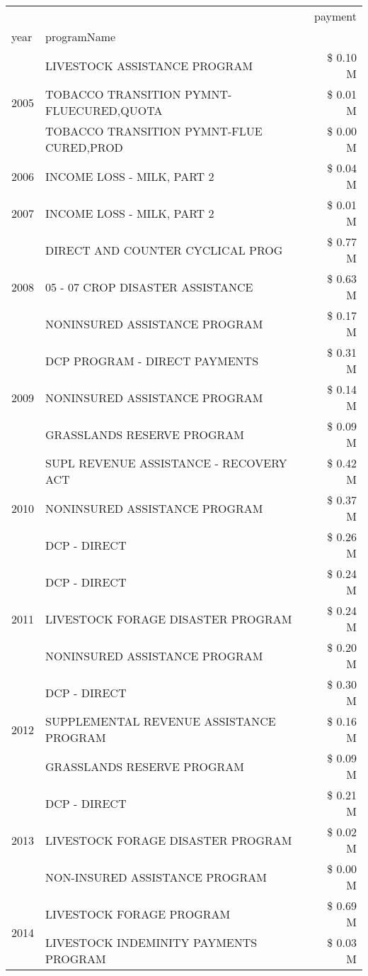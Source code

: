 \begin{tabular}{llr}
\toprule
 &  & payment \\
year & programName &  \\
\midrule
\multirow[t]{3}{*}{2005} & LIVESTOCK ASSISTANCE PROGRAM & \$ 0.10 M \\
 & TOBACCO TRANSITION PYMNT-FLUECURED,QUOTA & \$ 0.01 M \\
 & TOBACCO TRANSITION PYMNT-FLUE CURED,PROD & \$ 0.00 M \\
\cline{1-3}
2006 & INCOME LOSS - MILK, PART 2 & \$ 0.04 M \\
\cline{1-3}
2007 & INCOME LOSS - MILK, PART 2 & \$ 0.01 M \\
\cline{1-3}
\multirow[t]{3}{*}{2008} & DIRECT AND COUNTER CYCLICAL PROG & \$ 0.77 M \\
 & 05 - 07 CROP DISASTER ASSISTANCE & \$ 0.63 M \\
 & NONINSURED ASSISTANCE PROGRAM & \$ 0.17 M \\
\cline{1-3}
\multirow[t]{3}{*}{2009} & DCP PROGRAM - DIRECT PAYMENTS & \$ 0.31 M \\
 & NONINSURED ASSISTANCE PROGRAM & \$ 0.14 M \\
 & GRASSLANDS RESERVE PROGRAM & \$ 0.09 M \\
\cline{1-3}
\multirow[t]{3}{*}{2010} & SUPL REVENUE ASSISTANCE - RECOVERY ACT & \$ 0.42 M \\
 & NONINSURED ASSISTANCE PROGRAM & \$ 0.37 M \\
 & DCP - DIRECT & \$ 0.26 M \\
\cline{1-3}
\multirow[t]{3}{*}{2011} & DCP - DIRECT & \$ 0.24 M \\
 & LIVESTOCK FORAGE DISASTER PROGRAM & \$ 0.24 M \\
 & NONINSURED ASSISTANCE PROGRAM & \$ 0.20 M \\
\cline{1-3}
\multirow[t]{3}{*}{2012} & DCP - DIRECT & \$ 0.30 M \\
 & SUPPLEMENTAL REVENUE ASSISTANCE PROGRAM & \$ 0.16 M \\
 & GRASSLANDS RESERVE PROGRAM & \$ 0.09 M \\
\cline{1-3}
\multirow[t]{3}{*}{2013} & DCP - DIRECT & \$ 0.21 M \\
 & LIVESTOCK FORAGE DISASTER PROGRAM & \$ 0.02 M \\
 & NON-INSURED ASSISTANCE PROGRAM & \$ 0.00 M \\
\cline{1-3}
\multirow[t]{3}{*}{2014} & LIVESTOCK FORAGE PROGRAM & \$ 0.69 M \\
 & LIVESTOCK INDEMINITY PAYMENTS PROGRAM & \$ 0.03 M \\

\end{tabular}
